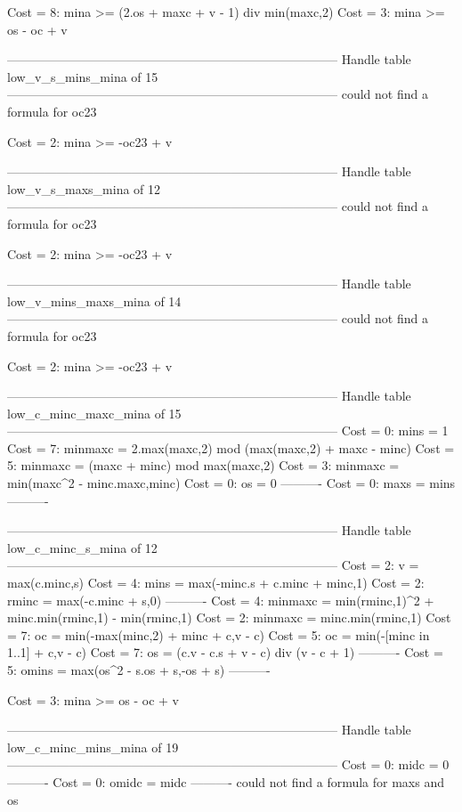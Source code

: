 Cost =  8:  mina >= (2.os + maxc + v - 1) div min(maxc,2)
Cost =  3:  mina >= os - oc + v

--------------------------------------------------------------------------------
Handle table low_v_s_mins_mina of 15
--------------------------------------------------------------------------------
could not find a formula for oc23

Cost =  2:  mina >= -oc23 + v

--------------------------------------------------------------------------------
Handle table low_v_s_maxs_mina of 12
--------------------------------------------------------------------------------
could not find a formula for oc23

Cost =  2:  mina >= -oc23 + v

--------------------------------------------------------------------------------
Handle table low_v_mins_maxs_mina of 14
--------------------------------------------------------------------------------
could not find a formula for oc23

Cost =  2:  mina >= -oc23 + v

--------------------------------------------------------------------------------
Handle table low_c_minc_maxc_mina of 15
--------------------------------------------------------------------------------
Cost =  0:  mins    = 1
Cost =  7:  minmaxc = 2.max(maxc,2) mod (max(maxc,2) + maxc - minc)
Cost =  5:  minmaxc = (maxc + minc) mod max(maxc,2)
Cost =  3:  minmaxc = min(maxc^2 - minc.maxc,minc)
Cost =  0:  os      = 0
----------
Cost =  0:  maxs    = mins
----------


--------------------------------------------------------------------------------
Handle table low_c_minc_s_mina of 12
--------------------------------------------------------------------------------
Cost =  2:  v       = max(c.minc,s)
Cost =  4:  mins    = max(-minc.s + c.minc + minc,1)
Cost =  2:  rminc   = max(-c.minc + s,0)
----------
Cost =  4:  minmaxc = min(rminc,1)^2 + minc.min(rminc,1) - min(rminc,1)
Cost =  2:  minmaxc = minc.min(rminc,1)
Cost =  7:  oc      = min(-max(minc,2) + minc + c,v - c)
Cost =  5:  oc      = min(-[minc in 1..1] + c,v - c)
Cost =  7:  os      = (c.v - c.s + v - c) div (v - c + 1)
----------
Cost =  5:  omins   = max(os^2 - s.os + s,-os + s)
----------

Cost =  3:  mina >= os - oc + v

--------------------------------------------------------------------------------
Handle table low_c_minc_mins_mina of 19
--------------------------------------------------------------------------------
Cost =  0:  midc  = 0
----------
Cost =  0:  omidc = midc
----------
could not find a formula for maxs and os


